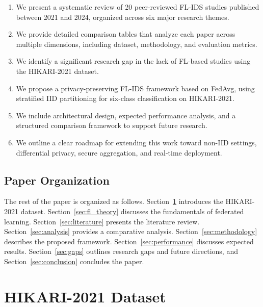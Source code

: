 \documentclass[conference]{IEEEtran}
\begin{document}
\begin{enumerate}
    \item We present a systematic review of 20 peer-reviewed FL-IDS studies published between 2021 and 2024, organized across six major research themes.

    \item We provide detailed comparison tables that analyze each paper across multiple dimensions, including dataset, methodology, and evaluation metrics.

    \item We identify a significant research gap in the lack of FL-based studies using the HIKARI-2021 dataset.

    \item We propose a privacy-preserving FL-IDS framework based on FedAvg, using stratified IID partitioning for six-class classification on HIKARI-2021.

    \item We include architectural design, expected performance analysis, and a structured comparison framework to support future research.

    \item We outline a clear roadmap for extending this work toward non-IID settings, differential privacy, secure aggregation, and real-time deployment.
\end{enumerate}

\subsection{Paper Organization}

The rest of the paper is organized as follows. Section~\ref{sec:hikari} introduces the HIKARI-2021 dataset. Section~\ref{sec:fl_theory} discusses the fundamentals of federated learning. Section~\ref{sec:literature} presents the literature review. Section~\ref{sec:analysis} provides a comparative analysis. Section~\ref{sec:methodology} describes the proposed framework. Section~\ref{sec:performance} discusses expected results. Section~\ref{sec:gaps} outlines research gaps and future directions, and Section~\ref{sec:conclusion} concludes the paper.

\section{HIKARI-2021 Dataset}
\label{sec:hikari}
\end{document}
